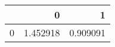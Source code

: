\begin{tabular}{lrr}
\toprule
{} &         0 &         1 \\
\midrule
0 &  1.452918 &  0.909091 \\
\bottomrule
\end{tabular}
